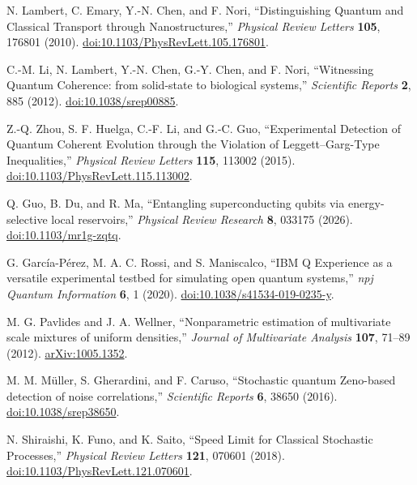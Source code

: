 N. Lambert, C. Emary, Y.-N. Chen, and F. Nori,
``Distinguishing Quantum and Classical Transport through Nanostructures,''
\emph{Physical Review Letters} \textbf{105}, 176801 (2010).
\href{https://doi.org/10.1103/PhysRevLett.105.176801}{doi:10.1103/PhysRevLett.105.176801}.

C.-M. Li, N. Lambert, Y.-N. Chen, G.-Y. Chen, and F. Nori,
``Witnessing Quantum Coherence: from solid-state to biological systems,''
\emph{Scientific Reports} \textbf{2}, 885 (2012).
\href{https://doi.org/10.1038/srep00885}{doi:10.1038/srep00885}.

Z.-Q. Zhou, S. F. Huelga, C.-F. Li, and G.-C. Guo,
``Experimental Detection of Quantum Coherent Evolution through the Violation
of Leggett--Garg-Type Inequalities,''
\emph{Physical Review Letters} \textbf{115}, 113002 (2015).
\href{https://doi.org/10.1103/PhysRevLett.115.113002}{doi:10.1103/PhysRevLett.115.113002}.

Q. Guo, B. Du, and R. Ma,
``Entangling superconducting qubits via energy-selective local reservoirs,''
\emph{Physical Review Research} \textbf{8}, 033175 (2026).
\href{https://doi.org/10.1103/mr1g-zqtq}{doi:10.1103/mr1g-zqtq}.

G. Garc\'{i}a-P\'{e}rez, M. A. C. Rossi, and S. Maniscalco,
``IBM Q Experience as a versatile experimental testbed for simulating open quantum systems,''
\emph{npj Quantum Information} \textbf{6}, 1 (2020).
\href{https://doi.org/10.1038/s41534-019-0235-y}{doi:10.1038/s41534-019-0235-y}.

M. G. Pavlides and J. A. Wellner,
``Nonparametric estimation of multivariate scale mixtures of uniform densities,''
\emph{Journal of Multivariate Analysis} \textbf{107}, 71--89 (2012).
\href{https://arxiv.org/abs/1005.1352}{arXiv:1005.1352}.

M. M. M\"uller, S. Gherardini, and F. Caruso,
``Stochastic quantum Zeno-based detection of noise correlations,''
\emph{Scientific Reports} \textbf{6}, 38650 (2016).
\href{https://doi.org/10.1038/srep38650}{doi:10.1038/srep38650}.

N. Shiraishi, K. Funo, and K. Saito,
``Speed Limit for Classical Stochastic Processes,''
\emph{Physical Review Letters} \textbf{121}, 070601 (2018).
\href{https://doi.org/10.1103/PhysRevLett.121.070601}{doi:10.1103/PhysRevLett.121.070601}.

